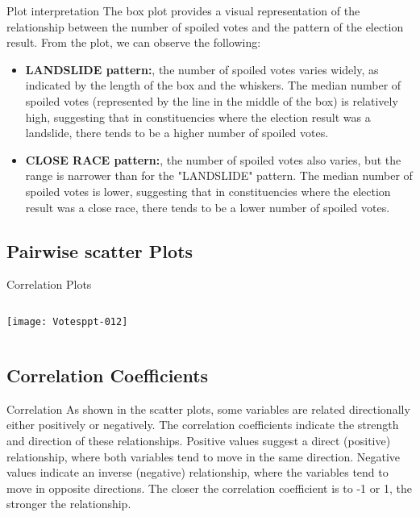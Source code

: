 \documentclass{beamer}
\begin{document}
\begin{frame}{Plot interpretation}
The box plot provides a visual representation of the relationship between the number of spoiled votes and the pattern of the election result.
From the plot, we can observe the following:
\begin{itemize}
\item \textbf{LANDSLIDE pattern:}, the number of spoiled votes varies widely, as indicated by the length of the box and the whiskers. The median number of spoiled votes (represented by the line in the middle of the box) is relatively high, suggesting that in constituencies where the election result was a landslide, there tends to be a higher number of spoiled votes.
\item \textbf{CLOSE RACE pattern:}, the number of spoiled votes also varies, but the range is narrower than for the "LANDSLIDE" pattern. The median number of spoiled votes is lower, suggesting that in constituencies where the election result was a close race, there tends to be a lower number of spoiled votes.
\end{itemize}
\end{frame}

\subsection{Pairwise scatter Plots}


\begin{frame}[fragile]{Correlation Plots}
\begin{columns}
\texttt{[image: Votesppt-012]}
\end{columns}
\end{frame}

\subsection{Correlation Coefficients}

\begin{frame}{Correlation}
As shown in the scatter plots, some variables are related directionally either positively or negatively. The correlation coefficients indicate the strength and direction of these relationships. Positive values suggest a direct (positive) relationship, where both variables tend to move in the same direction. Negative values indicate an inverse (negative) relationship, where the variables tend to move in opposite directions. The closer the correlation coefficient is to -1 or 1, the stronger the relationship.
\end{frame}
\end{document}
